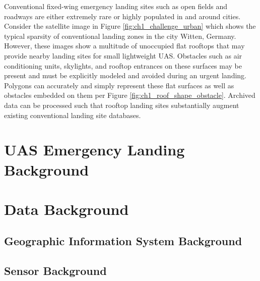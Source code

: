 Conventional fixed-wing emergency landing sites such as open fields and roadways are either extremely rare or highly populated in and around cities. Consider the satellite image in Figure \ref{fig:ch1_challenge_urban} which shows the typical sparsity of conventional landing zones in the city Witten, Germany. However, these images show a multitude of unoccupied flat rooftops that may provide nearby landing sites for small lightweight UAS. Obstacles such as air conditioning units, skylights, and rooftop entrances on these surfaces may be present and must be explicitly modeled and avoided during an urgent landing. Polygons can accurately and simply represent these flat surfaces as well as obstacles embedded on them per Figure \ref{fig:ch1_roof_shape_obstacle}. Archived data can be processed such that rooftop landing sites substantially augment existing conventional landing site databases.



\section{UAS Emergency Landing Background}

\section{Data Background}

\subsection{Geographic Information System Background}

\subsection{Sensor Background}
















